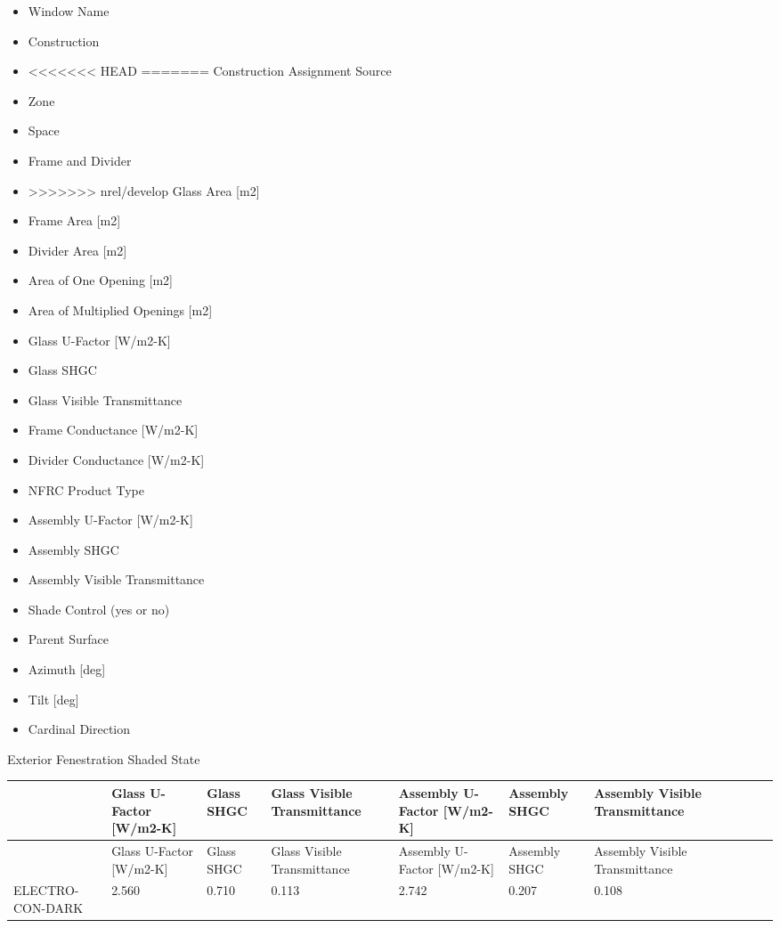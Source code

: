 \begin{itemize}
\item
  Window Name
\item
  Construction
\item
<<<<<<< HEAD
=======
  Construction Assignment Source
\item
  Zone
\item
  Space
\item
  Frame and Divider
\item
>>>>>>> nrel/develop
  Glass Area [m2]
\item
  Frame Area [m2]
\item
  Divider Area [m2]
\item
  Area of One Opening [m2]
\item
  Area of Multiplied Openings [m2]
\item
  Glass U-Factor [W/m2-K]
\item
  Glass SHGC
\item
  Glass Visible Transmittance
\item
  Frame Conductance [W/m2-K]
\item
  Divider Conductance [W/m2-K]
\item
  NFRC Product Type
\item
  Assembly U-Factor [W/m2-K]
\item
  Assembly SHGC
\item
  Assembly Visible Transmittance
\item
  Shade Control (yes or no)
\item
  Parent Surface
\item
  Azimuth [deg]
\item
  Tilt [deg]
\item
  Cardinal Direction
\end{itemize}



Exterior Fenestration Shaded State


{\scriptsize
\begin{longtable}[c]{>{\raggedright}p{0.5in}>{\raggedright}p{0.5in}>{\raggedright}p{0.5in}>{\raggedright}p{0.5in}>{\raggedright}p{0.5in}>{\raggedright}p{0.5in}>{\raggedright}p{0.5in}>{\raggedright}p{0.5in}>{\raggedright}p{0.5in}>{\raggedright}p{0.5in}>{\raggedright}p{0.5in}}
\toprule
~ & Glass U-Factor [W/m2-K] & Glass SHGC & Glass Visible Transmittance & Assembly U-Factor [W/m2-K] & Assembly SHGC & Assembly Visible Transmittance \tabularnewline
\midrule
\endfirsthead

\toprule
~ & Glass U-Factor [W/m2-K] & Glass SHGC & Glass Visible Transmittance & Assembly U-Factor [W/m2-K] & Assembly SHGC & Assembly Visible Transmittance \tabularnewline
\midrule
\endhead

ELECTRO-CON-DARK & 2.560 & 0.710 & 0.113 & 2.742 & 0.207 & 0.108 \tabularnewline

\bottomrule
\end{longtable}}

